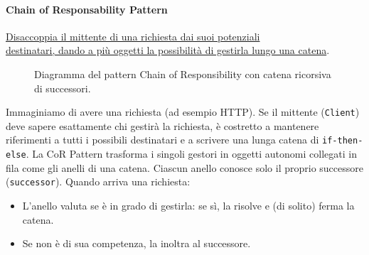 \documentclass[12pt]{extarticle}
\newcommand{\cn}[1]{\makebox[\linewidth][c]{\textbf{#1}}}
\begin{document}
\newpage
\paragraph{Chain of Responsability Pattern} \underline{Disaccoppia il mittente di una richiesta dai suoi potenziali }\\\underline{destinatari, dando a più oggetti la possibilità di gestirla lungo una catena}.

\begin{figure}[htbp]
\centering
{}
\caption{Diagramma del pattern Chain of Responsibility con catena ricorsiva di successori.}
\label{fig:pattern_cor_structure}
\end{figure}

\noindent Immaginiamo di avere una richiesta (ad esempio HTTP). Se il mittente (\texttt{Client}) deve sapere esattamente chi gestirà la richiesta, è costretto a mantenere riferimenti a tutti i possibili destinatari e a scrivere una lunga catena di \texttt{if-then-else}. La CoR Pattern trasforma i singoli gestori in oggetti autonomi collegati in fila come gli anelli di una catena. Ciascun anello conosce solo il proprio successore (\texttt{successor}). Quando arriva una richiesta:
\begin{itemize}
    \item L'anello valuta se è in grado di gestirla: se sì, la risolve e (di solito) ferma la catena.
    \item Se non è di sua competenza, la inoltra al successore.
\end{itemize}
\end{document}
